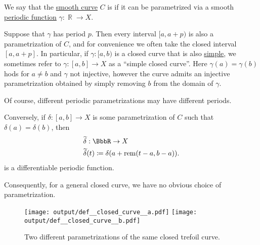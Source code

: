 \begin{definition}\label{def:closed_curve}\mimprovised
  We say that the \hyperref[def:smooth_curve]{smooth curve} \( C \) is  if it can be parametrized via a smooth \hyperref[def:periodic_function]{periodic function} \( \gamma: \BbbR \to X \).

  Suppose that \( \gamma \) has period \( p \). Then every interval \( [a, a + p) \) is also a parametrization of \( C \), and for convenience we often take the closed interval \( [a, a + p] \). In particular, if \( \gamma: [a, b) \) is a closed curve that is also \hyperref[def:simple_curve]{simple}, we sometimes refer to \( \gamma: [a, b] \to X \) as a \enquote{simple closed curve}. Here \( \gamma(a) = \gamma(b) \) hods for \( a \neq b \) and \( \gamma \) not injective, however the curve admits an injective parametrization obtained by simply removing \( b \) from the domain of \( \gamma \).

  Of course, different periodic parametrizations may have different periods.

  Conversely, if \( \delta: [a, b] \to X \) is some parametrization of \( C \) such that \( \delta(a) = \delta(b) \), then
  \begin{equation*}
    \begin{aligned}
      &\widetilde{\delta}: \BbbR \to X \\
      &\widetilde{\delta}(t) \coloneqq \delta(a + \rem(t - a, b - a)).
    \end{aligned}
  \end{equation*}
  is a differentiable periodic function.

  Consequently, for a general closed curve, we have no obvious choice of parametrization.

  \begin{figure}[!ht]
    \hfill
    \texttt{[image: output/def\_\_closed\_curve\_\_a.pdf]}
    \hfill
    \hfill
    \texttt{[image: output/def\_\_closed\_curve\_\_b.pdf]}
    \hfill
    \hfill
    \caption{Two different parametrizations of the same closed trefoil curve.}\label{fig:def:closed_curve}
  \end{figure}
\end{definition}

